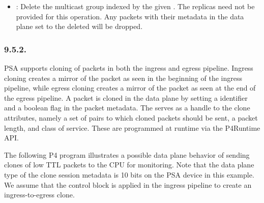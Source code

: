 \documentclass[11pt]{article}
\begin{document}
{\begin{itemize}[noitemsep,topsep=\mdcompacttopsep]
\item{}: Delete the multicast group indexed by the given
. The replicas need not be provided for this
operation. Any packets with their  metadata in the data plane
set to the deleted  will be dropped.%
\end{itemize}%

\subsubsection{9.5.2.\hspace*{0.5em}}\label{sec-clonesessionentry}%

\noindent{}PSA supports cloning of packets in both the ingress and egress pipeline. Ingress
cloning creates a mirror of the packet as seen in the beginning of the ingress
pipeline, while egress cloning creates a mirror of the packet as seen at the end
of the egress pipeline. A packet is cloned in the data plane by setting a
 identifier and a boolean flag  in the packet
metadata. The  serves as a handle to the clone attributes,
namely a set  of  pairs to which
cloned packets should be sent, a packet length, and class of
service. These are programmed at runtime via the P4Runtime
 API.%

The following P4 program illustrates a possible data plane behavior of sending
clones of low TTL packets to the CPU for monitoring. Note that the data plane
type of the clone session metadata is 10 bits on the PSA device in this example.
We assume that the  control block is applied in the ingress
pipeline to create an ingress-to-egress clone.%

}
\end{document}
